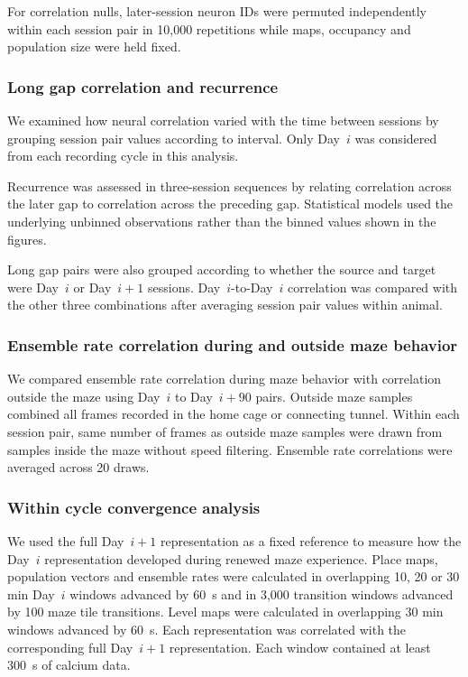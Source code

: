 \documentclass[fleqn,10pt]{wlscirep}
\begin{document}
For correlation nulls, later-session neuron IDs were permuted independently within each session pair in 10,000 repetitions while maps, occupancy and population size were held fixed.

\subsubsection*{Long gap correlation and recurrence}

We examined how neural correlation varied with the time between sessions by grouping session pair values according to interval. Only Day~$i$ was considered from each recording cycle in this analysis.

Recurrence was assessed in three-session sequences by relating correlation across the later gap to correlation across the preceding gap. Statistical models used the underlying unbinned observations rather than the binned values shown in the figures.

Long gap pairs were also grouped according to whether the source and target were Day~$i$ or Day~$i+1$ sessions. Day~$i$-to-Day~$i$ correlation was compared with the other three combinations after averaging session pair values within animal.

\subsubsection*{Ensemble rate correlation during and outside maze behavior}

We compared ensemble rate correlation during maze behavior with correlation outside the maze using Day~$i$ to Day~$i+90$ pairs. Outside maze samples combined all frames recorded in the home cage or connecting tunnel. Within each session pair, same number of frames as outside maze samples were drawn from samples inside the maze without speed filtering. Ensemble rate correlations were averaged across 20 draws.

\subsubsection*{Within cycle convergence analysis}

We used the full Day~$i+1$ representation as a fixed reference to measure how the Day~$i$ representation developed during renewed maze experience. Place maps, population vectors and ensemble rates were calculated in overlapping 10, 20 or 30 min Day~$i$ windows advanced by 60~s and in 3,000 transition windows advanced by 100 maze tile transitions. Level maps were calculated in overlapping 30 min windows advanced by 60~s. Each representation was correlated with the corresponding full Day~$i+1$ representation. Each window contained at least 300~s of calcium data. 
\end{document}
